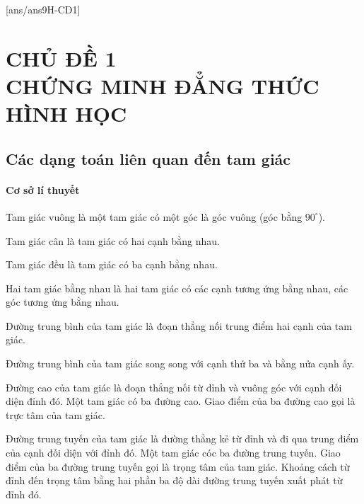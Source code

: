 [ans/ans9H-CD1]
\chapter*{CHỦ ĐỀ 1 \\ CHỨNG MINH ĐẲNG THỨC HÌNH HỌC}
\setcounter{section}{0}
\setcounter{ex}{0}
\section{Các dạng toán liên quan đến tam giác}
\subsubsection{Cơ sở lí thuyết}
\begin{dn}
	Tam giác vuông là một tam giác có một góc là góc vuông (góc bằng $90^\circ$).
\end{dn}

\begin{dn}
	Tam giác cân là tam giác có hai cạnh bằng nhau.
\end{dn}

\begin{dn}
	Tam giác đều là tam giác có ba cạnh bằng nhau.
\end{dn}

\begin{dn}
	Hai tam giác bằng nhau là hai tam giác có các cạnh tương ứng bằng nhau, các góc tương ứng bằng nhau.
\end{dn}

\begin{dn}
	Đường trung bình của tam giác là đoạn thẳng nối trung điểm hai cạnh của tam giác.
\end{dn}

\begin{hq}
	Đường trung bình của tam giác song song với cạnh thứ ba và bằng nửa cạnh ấy.
\end{hq}

\begin{dn}
	Đường cao của tam giác là đoạn thẳng nối từ đỉnh và vuông góc với cạnh đối diện đỉnh đó. Một tam giác có ba đường cao. Giao điểm của ba đường cao gọi là trực tâm của tam giác.
\end{dn}

\begin{dn}
	Đường trung tuyến của tam giác là đường thẳng kẻ từ đỉnh và đi qua trung điểm của cạnh đối diện với đỉnh đó. Một tam giác cóc ba đường trung tuyến. Giao điểm của ba đường trung tuyến gọi là trọng tâm của tam giác. Khoảng cách từ đỉnh đến trọng tâm bằng hai phần ba độ dài đường trung tuyến xuất phát từ đỉnh đó.
\end{dn}

